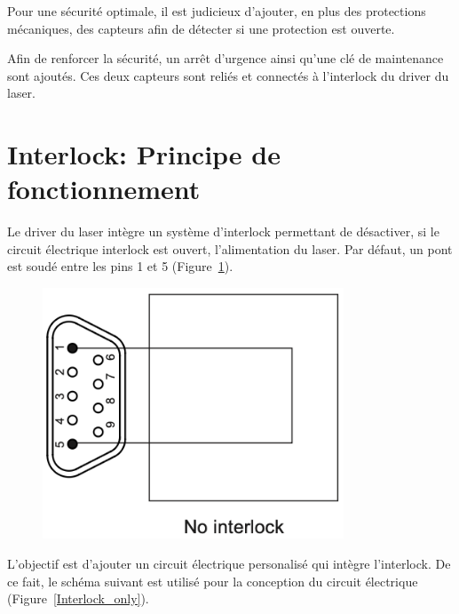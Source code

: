 Pour une sécurité optimale, il est judicieux d'ajouter, en plus des protections mécaniques, des capteurs afin de détecter si une protection est ouverte.

Afin de renforcer la sécurité, un arrêt d'urgence ainsi qu'une clé de maintenance sont ajoutés. Ces deux capteurs sont reliés et connectés à l'interlock du driver du laser.

\section{Interlock: Principe de fonctionnement}

\begin{minipage}[c]{0.6\textwidth}
    Le driver du laser intègre un système d'interlock permettant de désactiver, si le circuit électrique interlock est ouvert, l'alimentation du laser. Par défaut, un pont est soudé entre les pins 1 et 5 (Figure~\ref{No_interlock}).
\end{minipage}\hfill
\begin{minipage}[c]{0.35\textwidth}
    \begin{figure}[H]
        \begin{center}
            \includegraphics[width=0.8\textwidth]{assets/figures/Protections_laser/Securite_electrique/no_interlock.png}
        \end{center}
        \label{No_interlock}
    \end{figure}
\end{minipage}
\begin{minipage}[c]{0.6\textwidth}
    L'objectif est d'ajouter un circuit électrique personalisé qui intègre l'interlock. De ce fait, le schéma suivant est utilisé pour la conception du circuit électrique (Figure~\ref{Interlock_only}).
\end{minipage}\hfill
